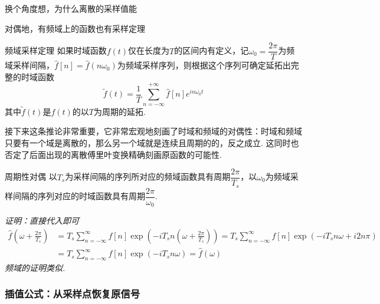 换个角度想，为什么离散的采样值能

对偶地，有频域上的函数也有采样定理
\begin{corollary}{频域采样定理}
    如果时域函数\(f(t)\)仅在长度为\(T\)的区间内有定义，记\(\omega_0=\dfrac{2\pi}{T}\)为频域采样间隔，\(\hat{f}[n]=\hat{f}(n\omega_0)\)为频域采样序列，则根据这个序列可确定延拓出完整的时域函数
    \[\tilde{f}(t)=\frac{1}{T}\sum_{n=-\infty}^{+\infty}\hat{f}[n]e^{in\omega_0t}\]
    其中\(\tilde{f}(t)\)是\(f(t)\)的以\(T\)为周期的延拓.
\end{corollary}

接下来这条推论非常重要，它非常宏观地刻画了时域和频域的对偶性：时域和频域只要有一个域是离散的，那么另一个域就是连续且周期的的，反之成立. 这同时也否定了后面出现的离散傅里叶变换精确刻画原函数的可能性.

\begin{corollary}{周期性对偶}
    以\(T_s\)为采样间隔的序列所对应的频域函数具有周期\(\dfrac{2\pi}{T_s}\)，以\(\omega_0\)为频域采样间隔的序列对应的时域函数具有周期\(\dfrac{2\pi}{\omega_0}\).
\end{corollary}
\textit{
    证明：直接代入即可
    \begin{align*}
        \hat{f}\left(\omega+\frac{2\pi}{T_s}\right) &= T_s \sum_{n=-\infty}^{\infty}f[n]\exp\left(-iT_sn(\omega+\frac{2\pi}{T_s})\right) = T_s \sum_{n=-\infty}^{\infty}f[n]\exp\left(-iT_sn\omega+i2n\pi\right) \\
        &= T_s \sum_{n=-\infty}^{\infty}f[n]\exp(-iT_sn\omega) = \hat{f}(\omega)
    \end{align*}
    频域的证明类似.
}

\subsubsection{插值公式：从采样点恢复原信号}

